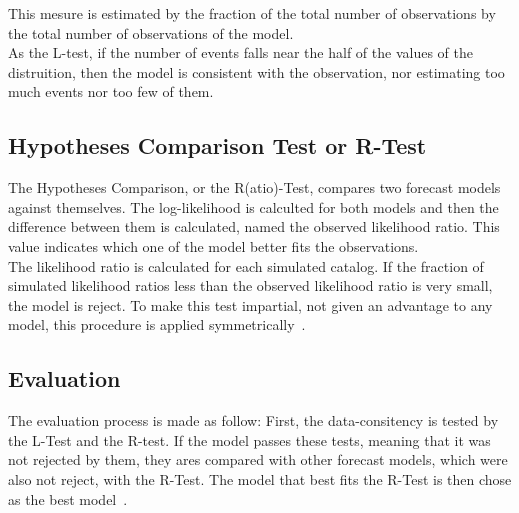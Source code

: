 This mesure is estimated by the fraction of the total number of observations by the total number of observations of the model.\\

As the L-test, if the number of events falls near the half of the values of the distruition, then the model is consistent with the observation, nor estimating too much events nor too few of them.\\

\subsection{Hypotheses Comparison Test or R-Test}

The Hypotheses Comparison, or the R(atio)-Test, compares two forecast models against themselves. The log-likelihood is calculted for both models and then the difference between them is calculated, named the observed likelihood ratio. This value indicates which one of the model better fits the observations.\\

The likelihood ratio is calculated for each simulated catalog. If the fraction of simulated likelihood ratios less than the observed likelihood ratio is very small, the model is reject.  To make this test impartial, not given an advantage to any model, this procedure is applied symmetrically~\cite{schorlemmer2010first}.\\


\subsection{Evaluation}\label{eval}
The evaluation process is made as follow: First, the data-consitency is tested by the L-Test and the R-test. If the model passes these tests, meaning that it was not rejected by them, they ares compared with other forecast models, which were also not reject, with the R-Test. The model that best fits the R-Test is then chose as the best model~\cite{schorlemmer2007earthquake}.\\
